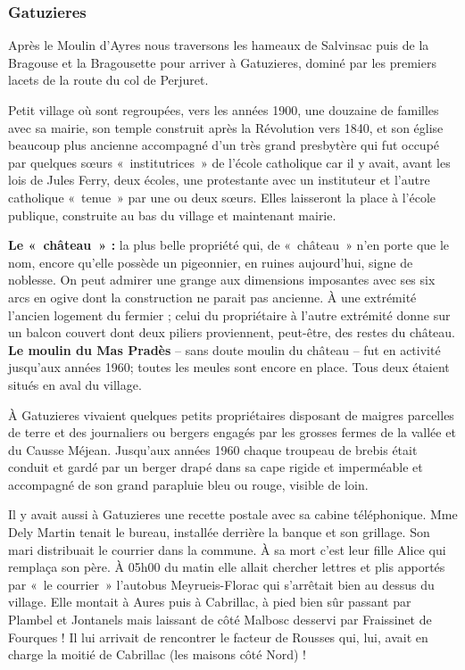 \subsubsection{Gatuzieres}

Après le Moulin d’Ayres nous traversons les hameaux de Salvinsac puis de la Bragouse et la
Bragousette pour arriver à Gatuzieres, dominé par les premiers lacets de la route du col de Perjuret.

Petit village où sont regroupées, vers les années 1900, une douzaine de familles avec sa mairie,
son temple construit après la Révolution vers 1840, et son église beaucoup plus ancienne
accompagné d’un très grand presbytère qui fut occupé par quelques sœurs «~institutrices~» de
l’école catholique car il y avait, avant les lois de Jules Ferry, deux écoles, une protestante
avec un instituteur et l’autre catholique «~tenue~» par une ou deux sœurs. Elles laisseront la
place à l’école publique, construite au bas du village et maintenant mairie.

\textbf{Le «~château~» :} la plus belle propriété qui, de «~château~» n’en porte que le nom, encore qu’elle
possède un pigeonnier, en ruines aujourd’hui, signe de noblesse. On peut admirer une grange aux
dimensions imposantes avec ses six arcs en ogive dont la construction ne parait pas ancienne. À une
extrémité l’ancien logement du fermier ; celui du propriétaire à l’autre extrémité donne sur un
balcon couvert dont deux piliers proviennent, peut-être, des restes du château. \textbf{Le moulin du Mas
Pradès} -- sans doute moulin du château -- fut en activité jusqu’aux années 1960; toutes les meules sont
encore en place. Tous deux étaient situés en aval du village.

À Gatuzieres vivaient quelques petits propriétaires disposant de maigres parcelles de terre et
des journaliers ou bergers engagés par les grosses fermes de la vallée et du Causse Méjean.
Jusqu’aux années 1960 chaque troupeau de brebis était conduit et gardé par un berger drapé
dans sa cape rigide et imperméable et accompagné de son grand parapluie bleu ou rouge,
visible de loin.

Il y avait aussi à Gatuzieres une recette postale avec sa cabine téléphonique. Mme Dely
Martin tenait le bureau, installée derrière la banque et son grillage. Son mari distribuait le
courrier dans la commune. À sa mort c’est leur fille Alice qui remplaça son père. À 05h00 du
matin elle allait chercher lettres et plis apportés par «~le courrier~» l’autobus Meyrueis-Florac
qui s’arrêtait bien au dessus du village. Elle montait à Aures puis à Cabrillac, à pied bien sûr
passant par Plambel et Jontanels mais laissant de côté Malbosc desservi par Fraissinet de
Fourques ! Il lui arrivait de rencontrer le facteur de Rousses qui, lui, avait en charge la
moitié de Cabrillac (les maisons côté Nord) !

